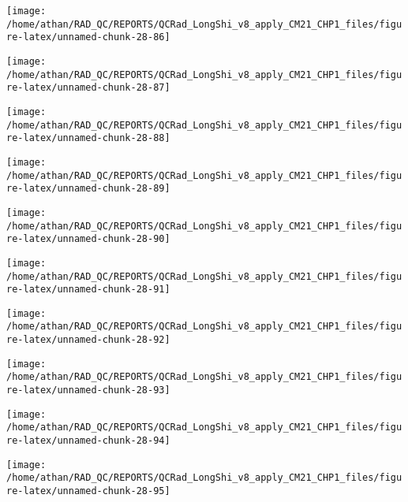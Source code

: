 \documentclass[
  10pt,
  a4paper,oneside]{article}
\begin{document}
\begin{center}\texttt{[image: /home/athan/RAD\_QC/REPORTS/QCRad\_LongShi\_v8\_apply\_CM21\_CHP1\_files/figure-latex/unnamed-chunk-28-86]} \end{center}

\begin{center}\texttt{[image: /home/athan/RAD\_QC/REPORTS/QCRad\_LongShi\_v8\_apply\_CM21\_CHP1\_files/figure-latex/unnamed-chunk-28-87]} \end{center}

\begin{center}\texttt{[image: /home/athan/RAD\_QC/REPORTS/QCRad\_LongShi\_v8\_apply\_CM21\_CHP1\_files/figure-latex/unnamed-chunk-28-88]} \end{center}

\begin{center}\texttt{[image: /home/athan/RAD\_QC/REPORTS/QCRad\_LongShi\_v8\_apply\_CM21\_CHP1\_files/figure-latex/unnamed-chunk-28-89]} \end{center}

\begin{center}\texttt{[image: /home/athan/RAD\_QC/REPORTS/QCRad\_LongShi\_v8\_apply\_CM21\_CHP1\_files/figure-latex/unnamed-chunk-28-90]} \end{center}

\begin{center}\texttt{[image: /home/athan/RAD\_QC/REPORTS/QCRad\_LongShi\_v8\_apply\_CM21\_CHP1\_files/figure-latex/unnamed-chunk-28-91]} \end{center}

\begin{center}\texttt{[image: /home/athan/RAD\_QC/REPORTS/QCRad\_LongShi\_v8\_apply\_CM21\_CHP1\_files/figure-latex/unnamed-chunk-28-92]} \end{center}

\begin{center}\texttt{[image: /home/athan/RAD\_QC/REPORTS/QCRad\_LongShi\_v8\_apply\_CM21\_CHP1\_files/figure-latex/unnamed-chunk-28-93]} \end{center}

\begin{center}\texttt{[image: /home/athan/RAD\_QC/REPORTS/QCRad\_LongShi\_v8\_apply\_CM21\_CHP1\_files/figure-latex/unnamed-chunk-28-94]} \end{center}

\begin{center}\texttt{[image: /home/athan/RAD\_QC/REPORTS/QCRad\_LongShi\_v8\_apply\_CM21\_CHP1\_files/figure-latex/unnamed-chunk-28-95]} \end{center}
\end{document}
